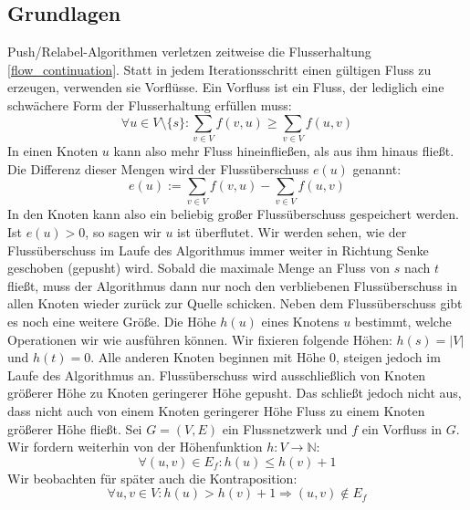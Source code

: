 \documentclass[12pt,a4paper,titlepage,onecolumn,ngerman,bibliography=totocnumbered]{scrartcl}
\theoremstyle{definition}
\theoremstyle{remark}
\newcommand{\pr}{Push/Relabel}
\begin{document}
\subsection{Grundlagen}
\pr -Algorithmen verletzen zeitweise die Flusserhaltung \eqref{flow_continuation}.
Statt in jedem Iterationsschritt einen gültigen Fluss zu erzeugen, verwenden sie Vorflüsse.
Ein Vorfluss ist ein Fluss, der lediglich eine schwächere Form der Flusserhaltung erfüllen muss:
\begin{equation}\label{eq:preflow}
	\forall u\in V\setminus\{s\}:\sum_{v\in V}f(v,u)\geq\sum_{v\in V}f(u,v)
\end{equation}
In einen Knoten $u$ kann also mehr Fluss hineinfließen, als aus ihm hinaus fließt.
Die Differenz dieser Mengen wird der Flussüberschuss $e(u)$ genannt:
\begin{equation}\label{eq:flow_excess}
	e(u) := \sum_{v\in V}f(v,u) -\sum_{v\in V}f(u,v)
\end{equation}
In den Knoten kann also ein beliebig großer Flussüberschuss gespeichert werden.
Ist $e(u)>0$, so sagen wir $u$ ist überflutet.
Wir werden sehen, wie der Flussüberschuss im Laufe des Algorithmus immer weiter in Richtung Senke geschoben (gepusht) wird.
Sobald die maximale Menge an Fluss von $s$ nach $t$ fließt, muss der Algorithmus dann nur noch den verbliebenen Flussüberschuss in allen Knoten wieder zurück zur Quelle schicken.
\medbreak
Neben dem Flussüberschuss gibt es noch eine weitere Größe.
Die Höhe $h(u)$ eines Knotens $u$ bestimmt, welche Operationen wir wie ausführen können.
Wir fixieren folgende Höhen: $h(s) = \lvert V\rvert$ und $h(t) = 0$.
Alle anderen Knoten beginnen mit Höhe $0$, steigen jedoch im Laufe des Algorithmus an.
Flussüberschuss wird ausschließlich von Knoten größerer Höhe zu Knoten geringerer Höhe gepusht.
Das schließt jedoch nicht aus, dass nicht auch von einem Knoten geringerer Höhe Fluss zu einem Knoten größerer Höhe fließt.
Sei $G=(V,E)$ ein Flussnetzwerk und $f$ ein Vorfluss in $G$.
Wir fordern weiterhin von der Höhenfunktion $h:V\to\mathbb{N}$:
\begin{equation}\label{eq:height_function}
	\forall (u,v)\in E_f: h(u)\leq h(v) + 1
\end{equation}
Wir beobachten für später auch die Kontraposition:
\begin{equation}\label{eq:contraposition_height}
	\forall u,v\in V: h(u) > h(v) + 1\Rightarrow (u,v) \not\in E_f
\end{equation}
\end{document}
